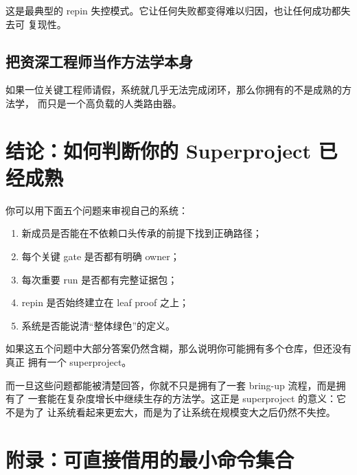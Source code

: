 \documentclass[UTF8,11pt,a4paper,oneside]{ctexbook}
\begin{document}
这是最典型的 repin 失控模式。它让任何失败都变得难以归因，也让任何成功都失去可
复现性。

\section{把资深工程师当作方法学本身}

如果一位关键工程师请假，系统就几乎无法完成闭环，那么你拥有的不是成熟的方法学，
而只是一个高负载的人类路由器。

\chapter{结论：如何判断你的 Superproject 已经成熟}

你可以用下面五个问题来审视自己的系统：

\begin{enumerate}
  \item 新成员是否能在不依赖口头传承的前提下找到正确路径；
  \item 每个关键 gate 是否都有明确 owner；
  \item 每次重要 run 是否都有完整证据包；
  \item repin 是否始终建立在 leaf proof 之上；
  \item 系统是否能说清“整体绿色”的定义。
\end{enumerate}

如果这五个问题中大部分答案仍然含糊，那么说明你可能拥有多个仓库，但还没有真正
拥有一个 superproject。

而一旦这些问题都能被清楚回答，你就不只是拥有了一套 bring-up 流程，而是拥有了
一套能在复杂度增长中继续生存的方法学。这正是 superproject 的意义：它不是为了
让系统看起来更宏大，而是为了让系统在规模变大之后仍然不失控。

\backmatter

\chapter*{附录：可直接借用的最小命令集合}
\end{document}
